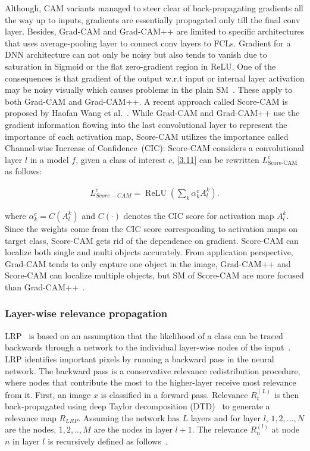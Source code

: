 \hspace*{3.5mm} Although, CAM variants managed to steer clear of back-propagating gradients all the way up to inputs, gradients are essentially propagated only till the final conv layer. Besides, Grad-CAM and Grad-CAM++ are limited to specific architectures that uses average-pooling layer to connect conv layers to FCLs. 
Gradient for a DNN architecture can not only be noisy but also tends to vanish due to saturation in Sigmoid or the flat zero-gradient region in ReLU. One of the consequences is that gradient of the output w.r.t input or internal layer activation may be noisy visually which causes problems in the plain SM~\cite{wang2020score}. 
\hspace*{3.5mm} These apply to both Grad-CAM and Grad-CAM++. A recent approach called Score-CAM is proposed by Haofan Wang et al.~\cite{wang2020score}. While Grad-CAM and Grad-CAM++ use the gradient information flowing into the last convolutional layer to represent the importance of each activation map, Score-CAM utilizes the importance called Channel-wise Increase of Confidence~(CIC): Score-CAM considers a convolutional layer $l$ in a model $f$, given a class of interest $c$, \cref{3.11} can be rewritten $L_{\text {Score-CAM}}^{c}$ as follows: 

\begin{align}
    L_{S c o r e-C A M}^{c}=\operatorname{ReLU}\left(\sum_{k} \alpha_{k}^{c} A_{l}^{k}\right).
\end{align}

\hspace*{3.5mm} where $\alpha_{k}^{c}=C\left(A_{l}^{k}\right)$ and  $C(\cdot)$ denotes the CIC score for activation map $A_{l}^{k}$. Since the weights come from the CIC score corresponding to activation maps on target class, Score-CAM gets rid of the dependence on gradient. Score-CAM can localize both single and multi objects accurately. From application perspective, Grad-CAM tends to only capture one object in the image, Grad-CAM++ and Score-CAM can localize multiple objects, but SM of Score-CAM are more focused than Grad-CAM++~\cite{wang2020score}.

\subsubsection{Layer-wise relevance propagation}
LRP~\cite{LRP1} is based on an assumption that the likelihood of a class can be traced backwards through a network to the individual layer-wise nodes of the input~\cite{LRP2}. LRP identifies important pixels by running a backward pass in the neural network. The backward pass is a conservative relevance redistribution procedure, where nodes that contribute the most to the higher-layer receive most relevance from it. First, an image $x$ is classified in a forward pass. Relevance $R_{t}^{(L)}$ is then back-propagated using deep Taylor decomposition (DTD)~\cite{DTD} to generate a relevance map $R_{LRP}$. Assuming the network has $L$ layers and for layer $l$, $1,2,...,N$ are the nodes, $1,2,..,M$ are the nodes in layer $l+ 1$. The relevance $R_{n}^{(l)}$ at node $n$ in layer $l$ is recursively defined as follows~\cite{LRP2}.  


